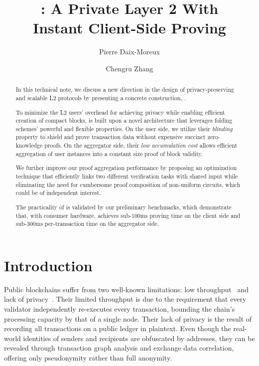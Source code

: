 \documentclass[a4paper,10pt]{article}
\title{\Protocol: A Private Layer 2 With \\ Instant Client-Side Proving}
\author[1]{Pierre Daix-Moreux}
\author[1,2]{Chengru Zhang}
\affil[1]{Ethereum Foundation}
\affil[2]{The University of Hong Kong}
\affil[ ]{\url{pierre@ethereum.org}, \url{u3008875@connect.hku.hk}}
\date{}
\begin{document}


\maketitle

\begin{abstract}

In this technical note, we discuss a new direction in the design of privacy-preserving and scalable \ac{L2} protocols by presenting a concrete construction, \Protocol.

To minimize the \ac{L2} users' overhead for achieving privacy while enabling efficient creation of compact blocks, \Protocol is built upon a novel architecture that leverages folding schemes' powerful and flexible properties.
On the user side, we utilize their \textit{blinding} property to shield and prove transaction data without expensive succinct zero-knowledge proofs.
On the aggregator side, their \textit{low accumulation cost} allows efficient aggregation of user instances into a constant size proof of block validity.


We further improve our proof aggregation performance by proposing an optimization technique that efficiently links two different verification tasks with shared input while eliminating the need for cumbersome proof composition of non-uniform circuits, which could be of independent interest.

The practicality of \Protocol is validated by our preliminary benchmarks, which demonstrate that, with consumer hardware, \Protocol achieves sub-100ms proving time on the client side and sub-300ms per-transaction time on the aggregator side.

\end{abstract}

\section{Introduction}

Public blockchains suffer from two well-known limitations: low throughput~\cite{FCW:CDEGJK16} and lack of privacy~\cite{FC:RonSha13}.
Their limited throughput is due to the requirement that every validator independently re-executes every transaction, bounding the chain's processing capacity by that of a single node.
Their lack of privacy is the result of recording all transactions on a public ledger in plaintext.
Even though the real-world identities of senders and recipients are obfuscated by addresses, they can be revealed through transaction graph analysis and exchange data correlation, offering only pseudonymity rather than full anonymity.
\end{document}
